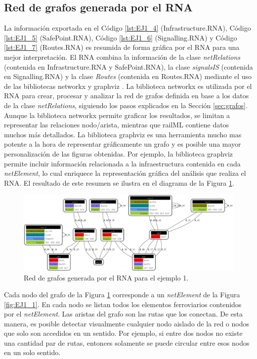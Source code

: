 \subsection{Red de grafos generada por el RNA}
	
 	La información exportada en el Código \ref{lst:EJ1_4} (Infrastructure.RNA), Código \ref{lst:EJ1_5} (SafePoint.RNA), Código \ref{lst:EJ1_6} (Signalling.RNA) y Código \ref{lst:EJ1_7} (Routes.RNA) es resumida de forma gráfica por el RNA para una mejor interpretación. El RNA combina la información de la clase \textit{netRelations} (contenida en Infrastructure.RNA y SafePoint.RNA), la clase \textit{signalsIS} (contenida en Signalling.RNA) y la clase \textit{Routes} (contenida en Routes.RNA) mediante el uso de las bibliotecas networkx \cite{NETWORKX} y graphviz \cite{GRAPHVIZ}. La biblioteca networkx es utilizada por el RNA para crear, procesar y analizar la red de grafos definida en base a los datos de la clase \textit{netRelations}, siguiendo los pasos explicados en la Sección \ref{sec:grafos}. Aunque la biblioteca networkx permite graficar los resultados, se limitan a representar las relaciones nodo/arista, mientras que railML contiene datos muchos más detallados. La biblioteca graphviz es una herramienta mucho mas potente a la hora de representar gráficamente un grafo y es posible una mayor personalización de las figuras obtenidas. Por ejemplo, la biblioteca graphviz permite incluir información relacionada a la infraestructura contenida en cada \textit{netElement}, lo cual enriquece la representación gráfica del análisis que realiza el RNA. El resultado de este resumen se ilustra en el diagrama de la Figura \ref{fig:EJ1_8}.

	\begin{figure}[H]
		\centering
		\includegraphics[origin = c, width=\textwidth]{Figuras/Graph_1}
		\centering\caption{Red de grafos generada por el RNA para el ejemplo 1.}
		\label{fig:EJ1_8}
	\end{figure}
	
	Cada nodo del grafo de la Figura \ref{fig:EJ1_8} corresponde a un \textit{netElement} de la Figura \ref{fig:EJ1_1}. En cada nodo se listan todos los elementos ferroviarios contenidos por el \textit{netElement}. Las aristas del grafo son las rutas que los conectan. De esta manera, es posible detectar visualmente cualquier nodo aislado de la red o nodos que solo son accedidos en un sentido. Por ejemplo, si entre dos nodos no existe una cantidad par de rutas, entonces solamente se puede circular entre esos nodos en un solo sentido.